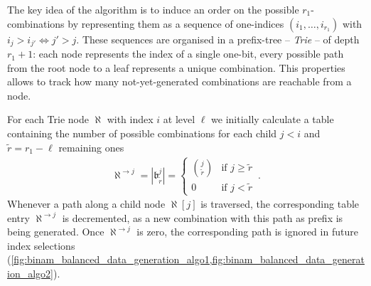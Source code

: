 The key idea of the algorithm is to induce an order on the possible $r_1$-combinations by representing them as a sequence of one-indices $(i_1, \ldots, i_{r_1})$ with $i_{j} > i_{j'} \Leftrightarrow j' > j$. These sequences are organised in a prefix-tree -- \emph{Trie} -- of depth $r_1 + 1$: each node represents the index of a single one-bit, every possible path from the root node to a leaf represents a unique combination. This properties allows to track how many not-yet-generated combinations are reachable from a node.

For each Trie node $\aleph$ with index $i$ at level $\ell$ we initially calculate a table containing the number of possible combinations for each child $j < i$ and $\tilde r = r_1 - \ell$ remaining ones
\begin{align}
	\aleph^{\to j} = |\mathfrak{b}^j_{\tilde r}| = \begin{cases}
		\binom{j}{\tilde r} & \text{if } j \geq \tilde r \\
		0 & \text{if } j < \tilde r
	\end{cases} \,.
	\label{eqn:possible_paths}
\end{align}
Whenever a path along a child node $\aleph[j]$ is traversed, the corresponding table entry $\aleph^{\to j}$ is decremented, as a new combination with this path as prefix is being generated. Once $\aleph^{\to j}$ is zero, the corresponding path is ignored in future index selections (\cref{fig:binam_balanced_data_generation_algo1,fig:binam_balanced_data_generation_algo2}).

